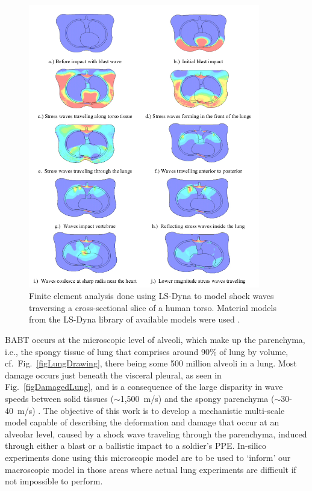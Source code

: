 \begin{figure}
    \centering\includegraphics[width=0.9\textwidth]{figures/shockWaveInTorso.png}
    \caption{Finite element analysis done using LS-Dyna to model shock waves traversing a cross-sectional slice of a human torso.  Material models from the LS-Dyna library of available models were used \cite{Josey10}.}
    \label{figShockWaveInLung}
\end{figure}

BABT occurs at the microscopic level of alveoli, which make up the parenchyma, i.e., the spongy tissue of lung that comprises around 90\% of lung by volume, cf.\ Fig.~\ref{figLungDrawing}, there being some 500 million alveoli in a lung.  Most damage occurs just beneath the visceral pleural, as seen in Fig.~\ref{figDamagedLung}, and is a consequence of the large disparity in wave speeds between solid tissues ($\sim$1,500~m/s) and the spongy parenchyma ($\sim$30-40~m/s) \cite{Stuhmiller08}.  The objective of this work is to develop a mechanistic multi-scale model capable of describing the deformation and damage that occur at an alveolar level, caused by a shock wave traveling through the parenchyma, induced through either a blast or a ballistic impact to a soldier's PPE.  In-silico experiments done using this microscopic model are to be used to `inform' our macroscopic model in those areas where actual lung experiments are difficult if not impossible to perform.

